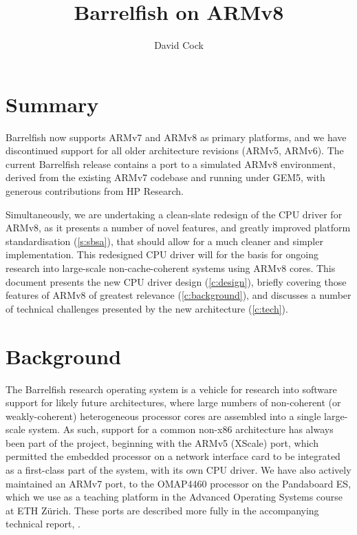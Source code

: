 \documentclass[a4paper,twoside]{report}
\title{Barrelfish on ARMv8}
\author{David Cock}
\begin{document}
\maketitle

\begin{versionhistory}
\end{versionhistory}

\chapter{Summary}

Barrelfish now supports ARMv7 and ARMv8 as primary platforms, and we have
discontinued support for all older architecture revisions (ARMv5, ARMv6). The
current Barrelfish release contains a port to a simulated ARMv8 environment,
derived from the existing ARMv7 codebase and running under GEM5, with generous
contributions from HP Research.

Simultaneously, we are undertaking a clean-slate redesign of the CPU driver
for ARMv8, as it presents a number of novel features, and greatly improved
platform standardisation (\autoref{s:sbsa}), that should allow for a much
cleaner and simpler implementation. This redesigned CPU driver will for the
basis for ongoing research into large-scale non-cache-coherent systems using
ARMv8 cores. This document presents the new CPU driver design
(\autoref{c:design}), briefly covering those features of ARMv8 of greatest
relevance (\autoref{c:background}), and discusses a number of technical
challenges presented by the new architecture (\autoref{c:tech}).

\chapter{Background}\label{c:background}

The Barrelfish research operating system is a vehicle for research into
software support for likely future architectures, where large numbers of
non-coherent (or weakly-coherent) heterogeneous processor cores are assembled
into a single large-scale system. As such, support for a common non-x86
architecture has always been part of the project, beginning with the ARMv5
(XScale) port, which permitted the embedded processor on a network interface
card to be integrated as a first-class part of the system, with its own CPU
driver. We have also actively maintained an ARMv7 port, to the OMAP4460
processor on the Pandaboard ES, which we use as a teaching platform in the
Advanced Operating Systems course at ETH Z\"urich. These ports are described
more fully in the accompanying technical report, \citet{btn017-arm}.
\end{document}
